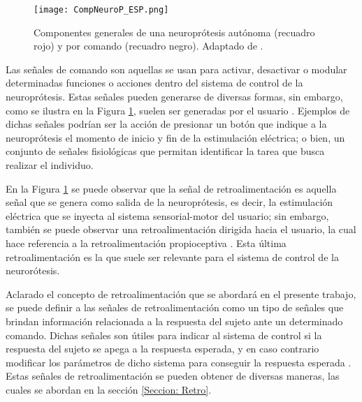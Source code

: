 \begin{figure}[htbp]
\centering
	\texttt{[image: CompNeuroP\_ESP.png]}
	\caption[Componentes generales de una neuroprótesis]{Componentes generales de una neuroprótesis autónoma (recuadro rojo) y por comando (recuadro negro). Adaptado de \cite{Popovic2015}.}
	\label{Figura: CompNeuroP}
\end{figure}

Las señales de comando son aquellas se usan para activar, desactivar o modular determinadas funciones o acciones dentro del sistema de control de la neuroprótesis. Estas señales pueden generarse de diversas formas, sin embargo, como se ilustra en la Figura \ref{Figura: CompNeuroP}, suelen ser generadas por el usuario \cite{Popovic2015}. Ejemplos de dichas señales podrían ser la acción de presionar un botón que indique a la neuroprótesis el momento de inicio y fin de la estimulación eléctrica; o bien, un conjunto de señales fisiológicas que permitan identificar la tarea que busca realizar el individuo.

En la Figura \ref{Figura: CompNeuroP} se puede observar que la señal de retroalimentación es aquella señal que se genera como salida de la neuroprótesis, es decir, la estimulación eléctrica que se inyecta al sistema sensorial-motor del usuario; sin embargo, también se puede observar una retroalimentación dirigida hacia el usuario, la cual hace referencia a la retroalimentación propioceptiva \cite{Popovic2015}. Esta última retroalimentación es la que suele ser relevante para el sistema de control de la neurorótesis.

Aclarado el concepto de retroalimentación que se abordará en el presente trabajo, se puede definir a las señales de retroalimentación como un tipo de señales que brindan información relacionada a la respuesta del sujeto ante un determinado comando. Dichas señales son útiles para indicar al sistema de control si la respuesta del sujeto se apega a la respuesta esperada, y en caso contrario modificar los parámetros de dicho sistema para conseguir la respuesta esperada \cite{Wright2016}. Estas señales de retroalimentación se pueden obtener de diversas maneras, las cuales se abordan en la sección \ref{Seccion: Retro}.

